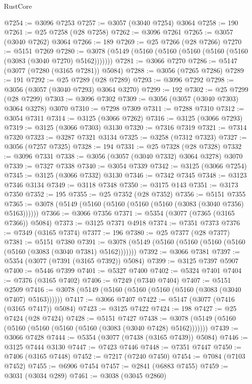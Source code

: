 \begin{lexlean}{RustCore}
\begin{coremodule}
@7254 := @3096 @7253
@7257 := @3057 (@3040 @7254) @3064
@7258 := 190
@7261 := @25 @7258 (@28 @7258)
@7262 := @3096 @7261
@7265 := @3057 (@3040 @7262) @3064
@7266 := 189
@7269 := @25 @7266 (@28 @7266)
@7270 := @5151 @7269
@7280 := @3078 (@5149 (@5160 (@5160 (@5160 (@5160 (@5160 (@3083 (@3040 @7270) @5162)))))))
@7281 := @3066 @7270
@7286 := @5147 (@3077 (@7280 (@3165 @7281)) @5084)
@7288 := @3056 (@7265 @7286)
@7289 := 191
@7292 := @25 @7289 (@28 @7289)
@7293 := @3096 @7292
@7298 := @3056 (@3057 (@3040 @7293) @3064 @3270)
@7299 := 192
@7302 := @25 @7299 (@28 @7299)
@7303 := @3096 @7302
@7309 := @3056 (@3057 (@3040 @7303) @3064 @3278) @3070
@7310 := @7298 @7309
@7311 := @7288 @7310
@7312 := @3054 @7311
@7314 := @3125 (@3066 @7262)
@7316 := @3125 (@3066 @7293)
@7319 := @3125 (@3066 @7303) @3130
@7320 := @7316 @7319
@7321 := @7314 @7320
@7323 := @3287 @7321 @3134
@7325 := @3258 (@7312 @7323)
@7327 := @3056 (@7257 @7325)
@7328 := 194
@7331 := @25 @7328 (@28 @7328)
@7332 := @3096 @7331
@7338 := @3056 (@3057 (@3040 @7332) @3064 @3278) @3070
@7339 := @7327 @7338
@7340 := @3054 @7339
@7342 := @3125 (@3066 @7254)
@7345 := @3125 (@3066 @7332) @3130
@7346 := @7342 @7345
@7348 := @3123 @7346 @3134
@7349 := @3118 @7348
@7350 := @3175 @143
@7351 := @3173 @7350
@7352 := 195
@7355 := @25 @7352 (@28 @7352)
@7356 := @5151 @7355
@7365 := @3078 (@5149 (@5160 (@5160 (@5160 (@5160 (@3083 (@3040 @7356) @5163))))))
@7366 := @3066 @7356
@7371 := @5354 (@3077 (@7365 (@3165 @7366)) @5084)
@7373 := @3125 @7371 @4918
@7374 := @7351 @7373
@7376 := @7349 (@3165 @7374)
@7377 := 196
@7380 := @25 @7377 (@28 @7377)
@7381 := @5151 @7380
@7391 := @3078 (@5149 (@5160 (@5160 (@5160 (@5160 (@5160 (@3083 (@3040 @7381) @5162)))))))
@7392 := @3066 @7381
@7397 := @5354 (@3077 (@7391 (@3165 @7392)) @5084)
@7399 := @3125 @7397 @5907
@7400 := @5446 @7399
@7401 := @5327 @7400
@7402 := @5324 @7401
@7404 := @7376 (@3165 @7402)
@7406 := @7249 (@7340 @7404)
@7407 := @5151 @2509
@7416 := @3078 (@5149 (@5160 (@5160 (@5160 (@5160 (@3083 (@3040 @7407) @5163))))))
@7417 := @3066 @7407
@7422 := @5147 (@3077 (@7416 (@3165 @7417)) @5084)
@7423 := @3125 @7422
@7424 := 198
@7427 := @25 @7424 (@28 @7424)
@7428 := @5151 @7427
@7438 := @3078 (@5149 (@5160 (@5160 (@5160 (@5160 (@5160 (@3083 (@3040 @7428) @5162)))))))
@7439 := @3066 @7428
@7444 := @5354 (@3077 (@7438 (@3165 @7439)) @5084)
@7446 := @3125 @7444 @3130
@7447 := @7423 @7446
@7448 := @7351 @7447
@7450 := @7406 (@3165 @7448)
@7452 := @7217 (@7240 @7450)
@7454 := @7084 (@7103 @7452)
@7455 := @6906 @7454
@7457 := @2841 (@6883 @7455)
@7459 := @3031 (@3034 @289)
@7461 := @3038 (@3045 @2860)

\end{coremodule}
\end{lexlean}
